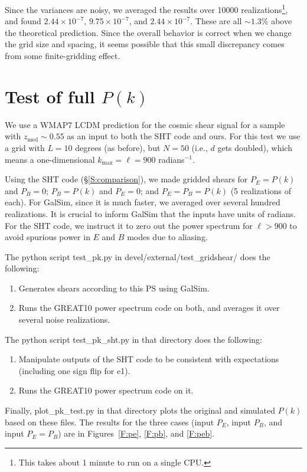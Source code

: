 \documentclass[preprint]{aastex}
\newcommand{\kmax}{\ensuremath{k_\mathrm{max}}}
\begin{document}
Since the variances are noisy, we averaged the results over 10000
realizations\footnote{This takes about 1 minute to run on a single
  CPU.}, and found $2.44\times 10^{-7}$, $9.75\times 10^{-7}$, and
$2.44\times 10^{-7}$.  These are all $\sim 1.3$\% above the
theoretical prediction. 
Since the overall behavior is correct when we change the grid size and
spacing, it seems possible that this small discrepancy comes from some
finite-gridding effect.

\section{Test of full $P(k)$}\label{S:testpk}

We use a WMAP7 LCDM prediction for the cosmic shear signal for a
sample with $z_\mathrm{med}\sim 0.55$ as an input to both
the SHT code and ours.  For this test we use a grid with
$L=10$ degrees (as before), but $N=50$ (i.e., $d$ gets doubled), which
means a one-dimensional $\kmax=\ell=900$ radians$^{-1}$.

Using the SHT code (\S\ref{S:comparison}), we made gridded shears for
$P_E=P(k)$ and $P_B=0$; $P_B=P(k)$ and $P_E=0$; and $P_E=P_B=P(k)$ (5
realizations of each).  For GalSim, since it is much faster, we
averaged over several hundred realizations.  It is crucial to inform
GalSim that the inputs have units of radians.  For the SHT code, we
instruct it to zero out the power spectrum for $\ell>900$ to avoid
spurious power in $E$ and $B$ modes due to aliasing.

The python script test\_pk.py in devel/external/test\_gridshear/ does the following:
\begin{enumerate}
\item Generates shears according to this PS using GalSim.
\item Runs the GREAT10 power spectrum code on both, and averages it over several
  noise realizations.
\end{enumerate}

The python script test\_pk\_sht.py in that directory does the following:
\begin{enumerate}
\item Manipulate outputs of the SHT code to be consistent with
  expectations (including one sign flip for e1).
\item Runs the GREAT10 power spectrum code on it.
\end{enumerate}

Finally, plot\_pk\_test.py in that directory plots the original and
simulated $P(k)$ based on these files.  The results for the three
cases (input $P_E$, input $P_B$, and input $P_E=P_B$) are in
Figures~\ref{F:pe}, \ref{F:pb}, and \ref{F:peb}.
\end{document}
